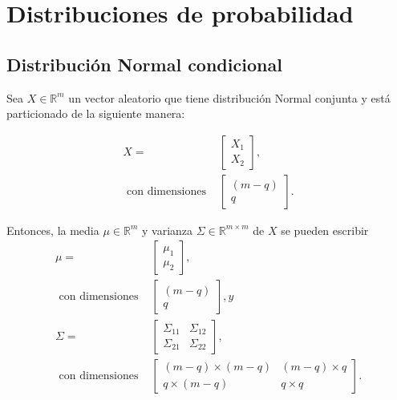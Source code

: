 \chapter[Distribuciones de probabilidad]{Distribuciones de probabilidad }\label{chap:Distributions}

\section{Distribuci\'on Normal condicional}

\begin{prop*}
    Sea $X \in \mathbb{R}^m$ un vector aleatorio que tiene distribuci\'on Normal conjunta y est\'a particionado de la siguiente manera:

    \begin{equation*}
    \begin{aligned}
        X = 
        &\left[
        \begin{array}{c}
            X_1  \\
            X_2
        \end{array}
        \right], \\
        \text{ con dimensiones }
        &\left[
        \begin{array}{c}
            (m-q)  \\
            q
        \end{array}
        \right].
    \end{aligned}
    \end{equation*}
    
    Entonces, la media $\mu \in \mathbb{R}^m$ y varianza $\Sigma \in \mathbb{R}^{m \times m}$ de $X$ se pueden escribir
    \begin{equation*}
    \begin{aligned}
        \mu = 
        &\left[
        \begin{array}{c}
            \mu_1  \\
            \mu_2
        \end{array}
        \right], \\
        \text{ con dimensiones }
        &\left[
        \begin{array}{c}
            (m-q)  \\
            q
        \end{array}
        \right], y\\
        \Sigma = 
        &\left[
        \begin{array}{cc}
            \Sigma_{11} & \Sigma_{12}  \\
            \Sigma_{21} & \Sigma_{22}
        \end{array}
        \right], \\
        \text{ con dimensiones }
        &\left[
        \begin{array}{cc}
            (m-q) \times (m-q)  & (m-q) \times q  \\
            q \times (m-q) & q \times q
        \end{array}
        \right].
    \end{aligned}
    \end{equation*}
    

\end{prop*}
